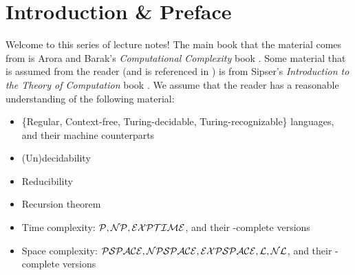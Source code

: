 \section{Introduction \& Preface}

Welcome to this series of lecture notes! The main book that the material comes from is Arora and Barak's \emph{Computational Complexity} book \cite{arora_baraz_computational_complexity}. Some material that is assumed from the reader (and is referenced in ) is from Sipser's \emph{Introduction to the Theory of Computation} book \cite{sipsertheoryofcomp}. We assume that the reader has a reasonable understanding of the following material:
\begin{itemize}
\item \{Regular, Context-free, Turing-decidable, Turing-recognizable\} languages, and their machine counterparts
\item (Un)decidability
\item Reducibility
\item Recursion theorem
\item Time complexity: $\mathcal{P}, \mathcal{NP}, \mathcal{EXPTIME}$, and their -complete versions
\item Space complexity: $\mathcal{PSPACE}, \mathcal{NPSPACE}, \mathcal{EXPSPACE}, \mathcal{L}, \mathcal{NL}$, and their -complete versions
\end{itemize}